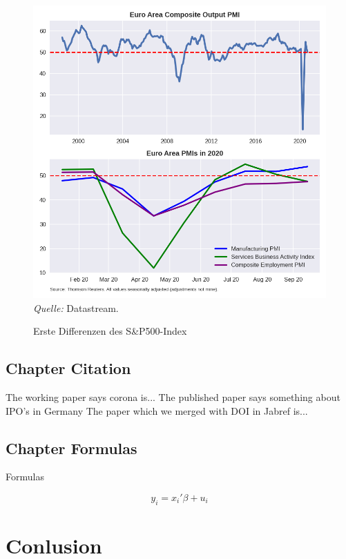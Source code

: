 \documentclass[12pt,a4paper]{article}
\begin{document}
 \begin{figure}[h!]
\caption{Erste Differenzen des S\&P500-Index}
\centering
\label{figure1}
\includegraphics[width=16cm]{plots.png}
{\it Quelle:} Datastream.
\end{figure}



\subsection{Chapter Citation}

The working paper \cite{} says corona is... 
The published paper \cite{Audretsch2006} says something about IPO's in Germany
The paper \cite{Milgrom_1982} which we merged with DOI in Jabref is...


 \subsection{Chapter Formulas}
 
Formulas 

\begin{equation}
y_i = x_i'\beta + u_i
\end{equation}

\section{Conlusion}
\end{document}
